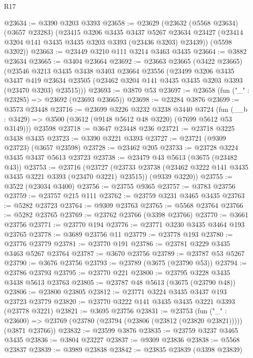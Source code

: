 \begin{lexlean}{R17}
\begin{coremodule}
@23634 := @3390 @3203 @3393
@23658 := @23629
    (@23632
      (@5568 @23634)
      (@3657 @23283)
      (@23415
        @3206
        @3435
        @3437
        @5267
        @23634
        @23427
        (@23414 @3204 @141 @3435 @3435 @3203 @3393 (@23436 @3203) @23439))
      (@5598 @3202))
@23663 := @23449 @3210 @111 @3214 @3463 @3435
@23664 := @3882 @23634
@23665 := @3404 @23664
@23692 := @23663
    @23665
    (@3422 @23665)
    (@23546
      @3213
      @3435
      @3438
      @3403
      @23664
      @23556
      (@23499
        @3206
        @3435
        @3437
        @419
        @23634
        @23505
        (@23462 @3204 @141 @3435 @3435 @3203 @3393 (@23470 @3203) @23515)))
@23693 := @3870 @53
@23697 := @23658 (fun ("_" : @23285) => @23692 (@23693 @23665))
@23698 := @23284 @3876
@23699 := @3573 @23448
@23716 := @23699
    @3226
    @3232
    @3238
    @3440
    @3724
    (fun (__b : @3429) => @3500 (@3612 (@9148 @5612 @48 @3220) (@7699 @5612 @53 @3149)))
    @23598
@23718 := @3647 @23448 @236
@23721 := @23718 @3225 @3438 @3435
@23723 := @3390 @3221 @3393
@23727 := @23721 (@9309 @23723) (@3657 @23598)
@23728 := @23462 @205
@23733 := @23728 @3224 @3435 @3437 @5613 @23723
@23738 := @23479 @43 @5613 (@3675 (@23482 @43))
@23753 := @23716
    (@23727
      (@23733 @23738 (@23462 @3222 @141 @3435 @3435 @3221 @3393 (@23470 @3221) @23515))
      (@9339 @3220))
@23755 := @3522 (@23034 @3400)
@23756 := @23755 @9365
@23757 := @3783 @23756
@23759 := @23757 @215 @111
@23762 := @23759 @3231 @3465 @3435
@23763 := @5282 @23723
@23764 := @9309 @23763
@23765 := @5568 @23764
@23766 := @5282 @23765
@23769 := @23762 @23766 (@3398 @23766)
@23770 := @3661 @23756
@23771 := @23770 @194
@23776 := @23771 @3230 @3435 @3464 @193 @23765
@23778 := @3689 @23756 @11
@23779 := @23778 @193
@23780 := @23776 @23779
@23781 := @23770 @191
@23786 := @23781 @3229 @3435 @3463 @5267 @23764
@23787 := @3670 @23756
@23789 := @23787 @53 @5267
@23790 := @3676 @23756
@23793 := @23789 (@3675 (@23790 @53))
@23794 := @23786 @23793
@23795 := @23770 @221
@23800 := @23795 @3228 @3435 @3438 @5613 @23763
@23805 := @23787 @48 @5613 (@3675 (@23790 @48))
@23806 := @23800 @23805
@23812 := @23771 @3224 @3435 @3437 @193 @23723 @23779
@23820 := @23770 @3222 @141 @3435 @3435 @3221 @3393 (@23778 @3221)
@23821 := @3695 @23756
@23831 := @23753
    (fun ("_" : @23600) =>
    @23769 (@23780 (@23794 (@23806 (@23812 (@23820 @23821))))) (@3871 @23766))
@23832 := @23599 @3876
@23835 := @23759 @3237 @3465 @3435
@23836 := @3804 @23227
@23837 := @9309 @23836
@23838 := @5568 @23837
@23839 := @3989 @23838
@23842 := @23835 @23839 (@3398 @23839)

\end{coremodule}
\end{lexlean}
